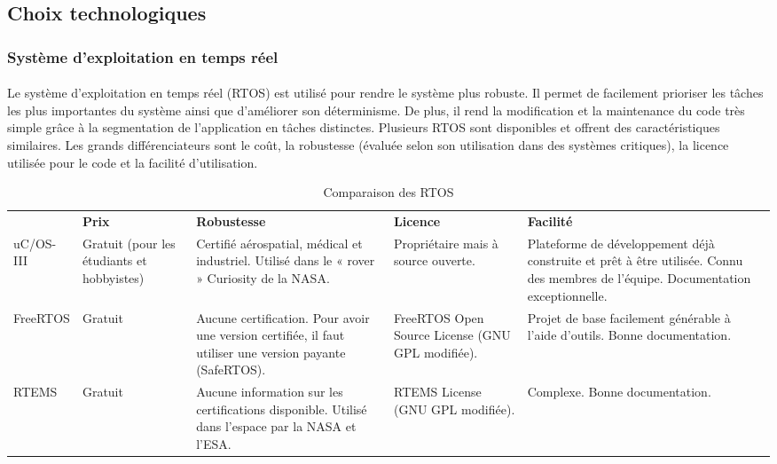 \subsection{Choix technologiques}
	\subsubsection{Système d'exploitation en temps réel}
		\paragraph*{}
		Le système d’exploitation en temps réel (RTOS) est utilisé pour rendre le système plus robuste. Il permet de facilement prioriser les tâches les plus importantes du système ainsi que d’améliorer son déterminisme. De plus, il rend la modification et la maintenance du code très simple grâce à la segmentation de l’application en tâches distinctes. Plusieurs RTOS sont disponibles et offrent des caractéristiques similaires. Les grands différenciateurs sont le coût, la robustesse (évaluée selon son utilisation dans des systèmes critiques), la licence utilisée pour le code et la facilité d’utilisation.

		\begin{table}[H]
			\centering
			\caption{Comparaison des RTOS}
			\label{my-label}
			\begin{tabular}{|p{3cm}|p{3cm}|p{3cm}|p{3cm}|p{3cm}|}
				\hline &
				\textbf{Prix} & \textbf{Robustesse} & \textbf{Licence} & \textbf{Facilité}
				\\ \hhline{|=|=|=|=|=|}
				uC/OS-III &
				Gratuit (pour les étudiants et hobbyistes) &
				Certifié aérospatial, médical et industriel.
				Utilisé dans le « rover » Curiosity de la NASA. &
				Propriétaire mais à source ouverte. &
				Plateforme de développement déjà construite et prêt à être utilisée.
				Connu des membres de l’équipe.
				Documentation exceptionnelle.
				\\ \hline
				FreeRTOS &
				Gratuit &
				Aucune certification. Pour avoir une version certifiée, il faut utiliser une version payante (SafeRTOS). &
				FreeRTOS Open Source License (GNU GPL modifiée). &
				Projet de base facilement générable à l’aide d’outils.
				Bonne documentation.
				\\ \hline
				RTEMS &
				Gratuit &
				Aucune information sur les certifications disponible.
				Utilisé dans l’espace par la NASA et l’ESA. &
				RTEMS License (GNU GPL modifiée). &
				Complexe.
				Bonne documentation.                                                                              \\ \hline
			\end{tabular}
		\end{table}

